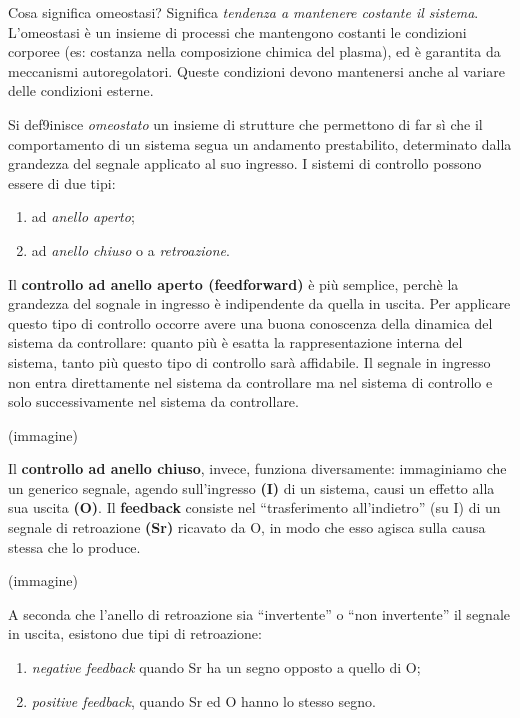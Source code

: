\documentclass[]{article}
\begin{document}
Cosa significa omeostasi? Significa \emph{tendenza a mantenere costante
il sistema}. L'omeostasi è un insieme di processi che mantengono
costanti le condizioni corporee (es: costanza nella composizione chimica
del plasma), ed è garantita da meccanismi autoregolatori. Queste
condizioni devono mantenersi anche al variare delle condizioni esterne.

Si def9inisce \emph{omeostato} un insieme di strutture che permettono di
far sì che il comportamento di un sistema segua un andamento
prestabilito, determinato dalla grandezza del segnale applicato al suo
ingresso. I sistemi di controllo possono essere di due tipi:

\begin{enumerate}
\def\labelenumi{\arabic{enumi}.}
\itemsep1pt\parskip0pt
\item
  ad \emph{anello aperto};
\item
  ad \emph{anello chiuso} o a \emph{retroazione}.
\end{enumerate}

Il \textbf{controllo ad anello aperto (feedforward)} è più semplice,
perchè la grandezza del sognale in ingresso è indipendente da quella in
uscita. Per applicare questo tipo di controllo occorre avere una buona
conoscenza della dinamica del sistema da controllare: quanto più è
esatta la rappresentazione interna del sistema, tanto più questo tipo di
controllo sarà affidabile. Il segnale in ingresso non entra direttamente
nel sistema da controllare ma nel sistema di controllo e solo
successivamente nel sistema da controllare.

(immagine)

Il \textbf{controllo ad anello chiuso}, invece, funziona diversamente:
immaginiamo che un generico segnale, agendo sull'ingresso \textbf{(I)}
di un sistema, causi un effetto alla sua uscita \textbf{(O)}. Il
\textbf{feedback} consiste nel ``trasferimento all'indietro'' (su I) di
un segnale di retroazione \textbf{(Sr)} ricavato da O, in modo che esso
agisca sulla causa stessa che lo produce.

(immagine)

A seconda che l'anello di retroazione sia ``invertente'' o ``non
invertente'' il segnale in uscita, esistono due tipi di retroazione:

\begin{enumerate}
\def\labelenumi{\arabic{enumi}.}
\itemsep1pt\parskip0pt
\item
  \emph{negative feedback} quando Sr ha un segno opposto a quello di O;
\item
  \emph{positive feedback}, quando Sr ed O hanno lo stesso segno.
\end{enumerate}
\end{document}
